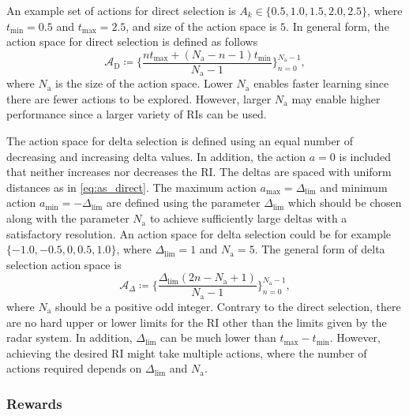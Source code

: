 \documentclass[english, 12pt, a4paper, elec, utf8, a-1b, online]{aaltothesis}
\numberwithin{equation}{section}
\newcommand{\amax}{a_\text{max}}
\newcommand{\amin}{a_\text{min}}
\newcommand{\As}{\mathcal{A}}
\newcommand{\tmax}{t_\text{max}}
\newcommand{\tmin}{t_\text{min}}
\newcommand{\deltalim}{\Delta_\text{lim}}
\newcommand{\Asdir}{\As_\text{D}}
\newcommand{\Asdelta}{\As_\Delta}
\newcommand{\nacts}{{N_\text{a}}}
\begin{document}
An example set of actions for direct selection is $A_k \in \{0.5, 1.0, 1.5, 2.0, 2.5\}$, where $\tmin=0.5$ and $\tmax=2.5$, and size of the action space is $5$.
In general form, the action space for direct selection is defined as follows
\begin{equation}\label{eq:as_direct}
    \Asdir \coloneqq \{ \frac{n \tmax + (\nacts-n-1) \tmin}{\nacts-1} \}_{n=0}^{\nacts-1},    
\end{equation}
where $\nacts$ is the size of the action space.
Lower $\nacts$ enables faster learning since there are fewer actions to be explored.
However, larger $\nacts$ may enable higher performance since a larger variety of RIs can be used.

The action space for delta selection is defined using an equal number of decreasing and increasing delta values. 
In addition, the action $a=0$ is included that neither increases nor decreases the RI.
The deltas are spaced with uniform distances as in \eqref{eq:as_direct}.
The maximum action $\amax=\deltalim$ and minimum action $\amin=-\deltalim$ are defined using the parameter $\deltalim$ which should be chosen along with the parameter $\nacts$ to achieve sufficiently large deltas with a satisfactory resolution.
An action space for delta selection could be for example $\{ -1.0, -0.5, 0, 0.5, 1.0 \}$, where $\deltalim=1$ and $\nacts=5$.
The general form of delta selection action space is
\begin{equation}\label{eq:as_delta}
    \Asdelta \coloneqq \{ \frac{\deltalim \left( 2 n - \nacts + 1 \right)}{\nacts-1} \}_{n=0}^{\nacts-1},
\end{equation}
where $\nacts$ should be a positive odd integer.
Contrary to the direct selection, there are no hard upper or lower limits for the RI other than the limits given by the radar system.
In addition, $\deltalim$ can be much lower than $\tmax - \tmin$.
However, achieving the desired RI might take multiple actions, where the number of actions required depends on $\deltalim$ and $\nacts$.

\subsubsection{Rewards} \label{sec:rewards}
\end{document}
